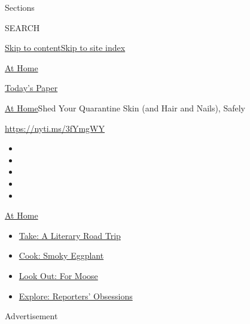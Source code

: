Sections

SEARCH

\protect\hyperlink{site-content}{Skip to
content}\protect\hyperlink{site-index}{Skip to site index}

\href{https://www.nytimes.com/spotlight/at-home}{At Home}

\href{https://myaccount.nytimes.com/auth/login?response_type=cookie\&client_id=vi}{}

\href{https://www.nytimes.com/section/todayspaper}{Today's Paper}

\href{/spotlight/at-home}{At Home}\textbar{}Shed Your Quarantine Skin
(and Hair and Nails), Safely

\url{https://nyti.ms/3fYmgWY}

\begin{itemize}
\item
\item
\item
\item
\item
\end{itemize}

\href{https://www.nytimes.com/spotlight/at-home?action=click\&pgtype=Article\&state=default\&region=TOP_BANNER\&context=at_home_menu}{At
Home}

\begin{itemize}
\tightlist
\item
  \href{https://www.nytimes.com/2020/07/28/books/time-for-a-literary-road-trip.html?action=click\&pgtype=Article\&state=default\&region=TOP_BANNER\&context=at_home_menu}{Take:
  A Literary Road Trip}
\item
  \href{https://www.nytimes.com/2020/07/29/magazine/bored-with-your-home-cooking-some-smoky-eggplant-will-fix-that.html?action=click\&pgtype=Article\&state=default\&region=TOP_BANNER\&context=at_home_menu}{Cook:
  Smoky Eggplant}
\item
  \href{https://www.nytimes.com/2020/07/27/travel/moose-michigan-isle-royale.html?action=click\&pgtype=Article\&state=default\&region=TOP_BANNER\&context=at_home_menu}{Look
  Out: For Moose}
\item
  \href{https://www.nytimes.com/interactive/2020/at-home/even-more-reporters-editors-diaries-lists-recommendations.html?action=click\&pgtype=Article\&state=default\&region=TOP_BANNER\&context=at_home_menu}{Explore:
  Reporters' Obsessions}
\end{itemize}

Advertisement

